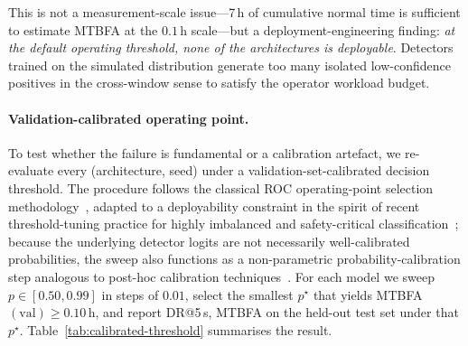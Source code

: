 \documentclass{ieeeaccess}
\begin{document}
This is not a measurement-scale issue---7\,h of cumulative normal time
is sufficient to estimate MTBFA at the $0.1$\,h scale---but a deployment-engineering
finding: \emph{at the default operating threshold, none of the architectures
is deployable}. Detectors trained on the simulated distribution
generate too many isolated low-confidence positives in the cross-window
sense to satisfy the operator workload budget.

\paragraph{Validation-calibrated operating point.}
To test whether the failure is fundamental or a calibration artefact, we
re-evaluate every (architecture, seed) under a validation-set-calibrated
decision threshold. The procedure follows the classical ROC operating-point
selection methodology~\cite{ref53}, adapted to a deployability constraint
in the spirit of recent threshold-tuning practice for highly imbalanced and
safety-critical classification~\cite{ref55}; because the underlying
detector logits are not necessarily well-calibrated probabilities, the
sweep also functions as a non-parametric probability-calibration step
analogous to post-hoc calibration techniques~\cite{ref54}.
For each model we sweep
$p \in [0.50, 0.99]$ in steps of $0.01$, select the smallest $p^\star$ that
yields MTBFA$(\text{val})\ge 0.10$\,h, and report DR@5\,s, MTBFA on the
held-out test set under that $p^\star$.
Table~\ref{tab:calibrated-threshold} summarises the result.

\begin{table}[!t]
\caption{Validation-calibrated operating-point experiment. For each
architecture, $p^\star$ is the smallest decision threshold (swept on
validation) that yields MTBFA$(\text{val}) \ge 0.10$\,h; DR@5\,s and
MTBFA are reported on the test set under that $p^\star$.
``Test DR@5\,s ($p{=}0.5$)'' is the test-set detection rate evaluated
at the fixed threshold sweep value $p=0.5$ (the leftmost point of the
calibration sweep) and is the baseline against which $\Delta$DR is
computed; for five of seven architectures it agrees with the per-seed
default-threshold value reported in Table~\ref{tab:overall-timeaware},
but for CNN and BiLSTM the per-seed defaults differ from $p=0.5$,
which is why the two tables list slightly different default DR@5\,s
for these two rows.
The architectural cost of MTBFA-feasibility differs by an order of
magnitude across the seven detectors.}
\label{tab:calibrated-threshold}
\centering

\end{table}
\end{document}
